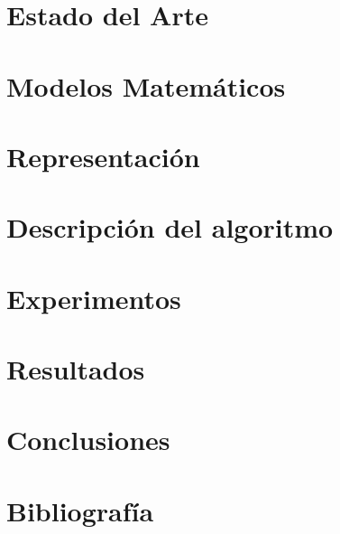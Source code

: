 \documentclass[letter, 10pt]{article}
\begin{document}
\section{Estado del Arte}
\label{sec:estado}

\section{Modelos Matemáticos}
\label{sec:modelo}

\section{Representación}
\label{sec:representacion}

\section{Descripción del algoritmo}
\label{sec:algoritmo}

\section{Experimentos}
\label{sec:experimentos}

\section{Resultados}
\label{sec:resultados}

\section{Conclusiones}
\label{sec:conclusiones}

\section{Bibliografía}


\end{document}
